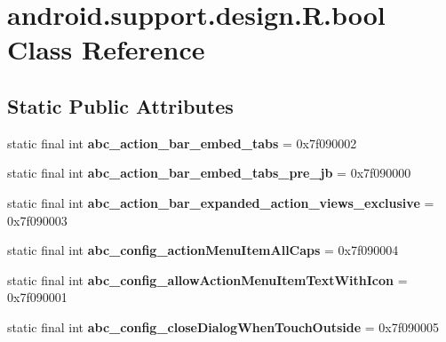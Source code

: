 \hypertarget{classandroid_1_1support_1_1design_1_1_r_1_1bool}{}\section{android.\+support.\+design.\+R.\+bool Class Reference}
\label{classandroid_1_1support_1_1design_1_1_r_1_1bool}
\subsection*{Static Public Attributes}
\begin{DoxyCompactItemize}
\item 
\hypertarget{classandroid_1_1support_1_1design_1_1_r_1_1bool_a12b8abdc03b45f744e5cd022a682e181}{}static final int {\bfseries abc\+\_\+action\+\_\+bar\+\_\+embed\+\_\+tabs} = 0x7f090002\label{classandroid_1_1support_1_1design_1_1_r_1_1bool_a12b8abdc03b45f744e5cd022a682e181}

\item 
\hypertarget{classandroid_1_1support_1_1design_1_1_r_1_1bool_a12e83ff017fbb88ad4653081de30adb5}{}static final int {\bfseries abc\+\_\+action\+\_\+bar\+\_\+embed\+\_\+tabs\+\_\+pre\+\_\+jb} = 0x7f090000\label{classandroid_1_1support_1_1design_1_1_r_1_1bool_a12e83ff017fbb88ad4653081de30adb5}

\item 
\hypertarget{classandroid_1_1support_1_1design_1_1_r_1_1bool_abf9866311459eb281e6f06be06c3de97}{}static final int {\bfseries abc\+\_\+action\+\_\+bar\+\_\+expanded\+\_\+action\+\_\+views\+\_\+exclusive} = 0x7f090003\label{classandroid_1_1support_1_1design_1_1_r_1_1bool_abf9866311459eb281e6f06be06c3de97}

\item 
\hypertarget{classandroid_1_1support_1_1design_1_1_r_1_1bool_a4877609fc5e66b66c02146bb21a07830}{}static final int {\bfseries abc\+\_\+config\+\_\+action\+Menu\+Item\+All\+Caps} = 0x7f090004\label{classandroid_1_1support_1_1design_1_1_r_1_1bool_a4877609fc5e66b66c02146bb21a07830}

\item 
\hypertarget{classandroid_1_1support_1_1design_1_1_r_1_1bool_a80492d376ea804d72a20600b947189a0}{}static final int {\bfseries abc\+\_\+config\+\_\+allow\+Action\+Menu\+Item\+Text\+With\+Icon} = 0x7f090001\label{classandroid_1_1support_1_1design_1_1_r_1_1bool_a80492d376ea804d72a20600b947189a0}

\item 
\hypertarget{classandroid_1_1support_1_1design_1_1_r_1_1bool_a8dd305af540f7f30274ca9c611c2835d}{}static final int {\bfseries abc\+\_\+config\+\_\+close\+Dialog\+When\+Touch\+Outside} = 0x7f090005\label{classandroid_1_1support_1_1design_1_1_r_1_1bool_a8dd305af540f7f30274ca9c611c2835d}


\end{DoxyCompactItemize}
